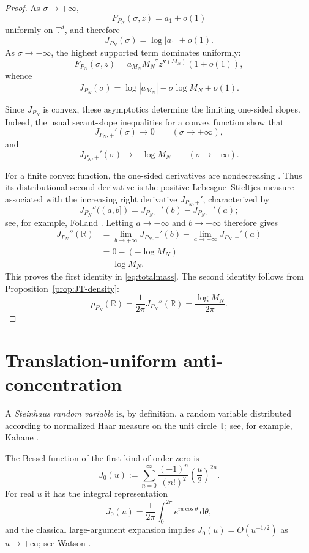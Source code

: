 \documentclass[11pt]{article}
\theoremstyle{definition}
\newcommand{\R}{\mathbb R}
\newcommand{\T}{\mathbb T}
\newcommand{\dd}{\,\mathrm d}
\newcommand{\1}{\mathbf 1}
\begin{document}
\begin{proof}
As $\sigma\to+\infty$,
\[
F_{P_N}(\sigma,z)=a_1+o(1)
\]
uniformly on $\T^d$, and therefore
\[
J_{P_N}(\sigma)=\log|a_1|+o(1).
\]
As $\sigma\to-\infty$, the highest supported term dominates uniformly:
\[
F_{P_N}(\sigma,z)
=
a_{M_N}M_N^{-\sigma}z^{\mathbf v(M_N)}(1+o(1)),
\]
whence
\[
J_{P_N}(\sigma)
=
\log|a_{M_N}|-\sigma\log M_N+o(1).
\]

Since $J_{P_N}$ is convex, these asymptotics determine the limiting
one-sided slopes.  Indeed, the usual secant-slope inequalities for a
convex function show that
\[
J_{P_N,+}'(\sigma)\longrightarrow0
\qquad(\sigma\to+\infty),
\]
and
\[
J_{P_N,+}'(\sigma)\longrightarrow-\log M_N
\qquad(\sigma\to-\infty).
\]

For a finite convex function, the one-sided derivatives are
nondecreasing \cite[Theorem~24.1]{Rockafellar1970}.  Thus its
distributional second derivative is the positive Lebesgue--Stieltjes
measure associated with the increasing right derivative
$J_{P_N,+}'$, characterized by
\[
J_{P_N}''((a,b])
=
J_{P_N,+}'(b)-J_{P_N,+}'(a);
\]
see, for example, Folland \cite[Section~1.5]{Folland1999}.
Letting $a\to-\infty$ and $b\to+\infty$ therefore gives
\begin{align*}
J_{P_N}''(\R)
&=
\lim_{b\to+\infty}J_{P_N,+}'(b)
-
\lim_{a\to-\infty}J_{P_N,+}'(a)\\
&=
0-(-\log M_N)\\
&=
\log M_N.
\end{align*}
This proves the first identity in \eqref{eq:totalmass}.  The second
identity follows from Proposition~\ref{prop:JT-density}:
\[
\rho_{P_N}(\R)
=
\frac{1}{2\pi}J_{P_N}''(\R)
=
\frac{\log M_N}{2\pi}.
\]
\end{proof}

\section{Translation-uniform anti-concentration}\label{sec:anti}

A \emph{Steinhaus random variable} is, by definition, a random variable distributed according to normalized Haar measure on the unit circle $\T$; see, for example, Kahane \cite[Chapter~1]{Kahane1985}. 

The Bessel function of the first kind of order zero is
\begin{equation}\label{eq:J0-definition}
J_0(u)
:=
\sum_{n=0}^{\infty}\frac{(-1)^n}{(n!)^2}
\left(\frac{u}{2}\right)^{2n}.
\end{equation}
For real $u$ it has the integral representation
\begin{equation}\label{eq:J0-integral}
J_0(u)
=
\frac1{2\pi}\int_0^{2\pi}e^{iu\cos\theta}\dd\theta,
\end{equation}
and the classical large-argument expansion implies $J_0(u)=O(u^{-1/2})$ as $u\to+\infty$; see Watson \cite[\S\S2.11, 2.2 and 7.21]{Watson1944}.
\end{document}
